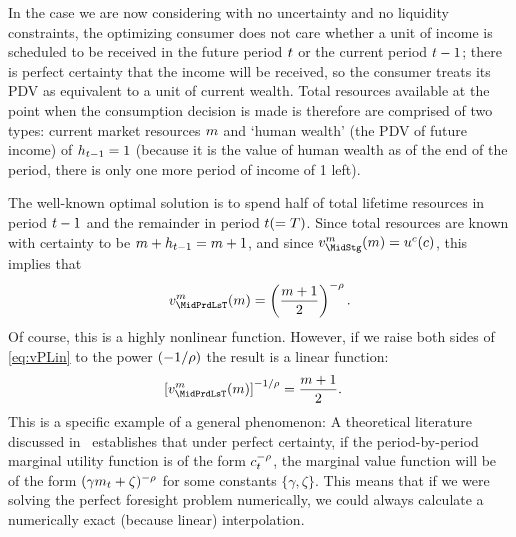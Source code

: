 In the case we are now considering with no uncertainty and no liquidity constraints, the optimizing consumer does not care whether a unit of income is scheduled to be received in the future period $t$ or the current period $t-1$; there is perfect certainty that the income will be received, so the consumer treats its PDV as equivalent to a unit of current wealth.  Total resources available at the point when the consumption decision is made is therefore are comprised of two types: current market resources $m$ and `human wealth' (the PDV of future income) of $h_{t-1}=1$ (because it is the value of human wealth as of the end of the period, there is only one more period of income of 1 left).

The well-known optimal solution is to spend half of total lifetime resources in period $t-1$ and the remainder in period $t (=T)$.  Since total resources are known with certainty to be $m+h_{t-1}= m+1$, and since ${\vFunc}_{\MidStg}^{{m}}(\mNrm) = \uFunc^{{c}}(\cNrm)$, this implies that
\begin{equation}
  \vFunc^{{m}}_{\MidPrdLsT}(\mNrm)  = \left(\frac{\mNrm+1}{2}\right)^{-\CRRA} \label{eq:vPLin}.
\end{equation}
Of course, this is a highly nonlinear function.  However, if we raise both sides of \eqref{eq:vPLin} to the power $(-1/\rho)$ the result is a linear function:
\begin{equation}\begin{gathered}\begin{aligned}
      \left[\vFunc^{{m}}_{\MidPrdLsT}(\mNrm)\right]^{-1/\CRRA}  & = \frac{\mNrm+1}{2}  .
    \end{aligned}\end{gathered}\end{equation}
This is a specific example of a general phenomenon: A theoretical literature discussed in~\cite{ckConcavity} establishes that under perfect certainty, if the period-by-period marginal utility function is of the form $c_{t}^{-\rho}$, the marginal value function will be of the form $(\gamma {m}_{t}+\zeta)^{-\rho}$ for some constants $\{\gamma,\zeta\}$.  This means that if we were solving the perfect foresight problem numerically, we could always calculate a numerically exact (because linear) interpolation.

